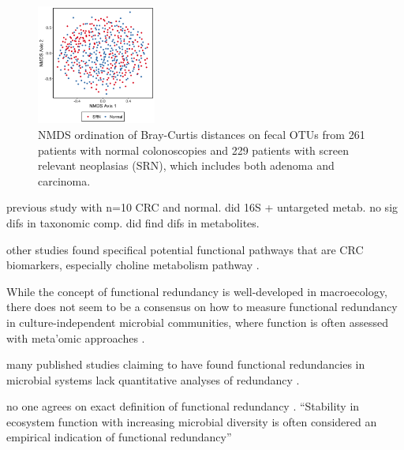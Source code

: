 \documentclass[11pt]{article}
\begin{document}
\begin{figure}
    \vspace{-20pt}
    \begin{center}
        \includegraphics[width=0.35\textwidth]{figures/topcuoglu_s1.png}
        \caption{NMDS ordination of Bray-Curtis distances on fecal OTUs from 261 patients with normal colonoscopies and 229 patients with screen relevant neoplasias (SRN), which includes both adenoma and carcinoma. \cite{topcuoglu_framework_2020}}
        \label{fig:nmds_otu}
    \end{center}
    \vspace{-20pt}
\end{figure}


previous study with n=10 CRC and normal. did 16S + untargeted metab. no sig difs in taxonomic comp. did find difs in metabolites. \cite{weir_stool_2013}

other studies found specifical potential functional pathways that are CRC biomarkers, especially choline metabolism pathway \cite{thomas_metagenomic_2019}.

While the concept of functional redundancy is well-developed in macroecology,
there does not seem to be a consensus on how to measure functional redundancy in culture-independent microbial communities,
where function is often assessed with meta'omic approaches \cite{ricotta_measuring_2016, louca_function_2018, heintz-buschart_human_2018, royalty_quantitative_2020}.

many published studies claiming to have found functional redundancies in microbial systems lack quantitative analyses of redundancy \cite{souza_metagenomic_2015, ferrer_microbiota_2013, galambos_genome-resolved_2019}.

no one agrees on exact definition of functional redundancy \cite{louca_function_2018, heintz-buschart_human_2018, tully_dynamic_2018, royalty_quantitative_2020}.
``Stability in ecosystem function with increasing microbial diversity is often considered an empirical indication of functional redundancy''
\cite{royalty_quantitative_2020}
\end{document}
